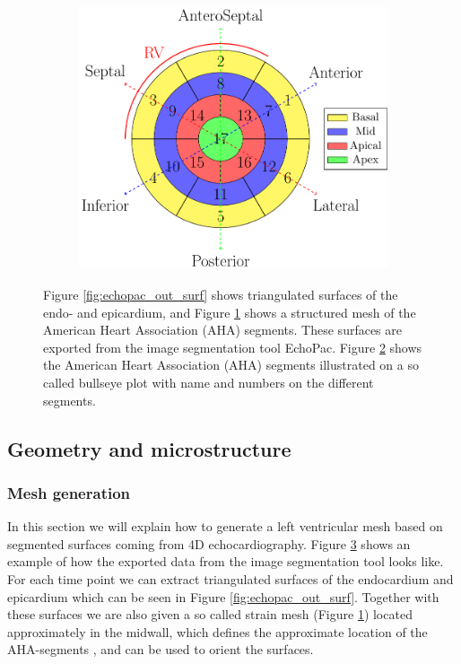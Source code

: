 \begin{figure}[htbp]
\begin{subfigure}[t]{0.3\textwidth}
    \caption{\label{fig:echopac_out_strain_mesh}}
  \end{subfigure}
  \begin{subfigure}[t]{0.38\textwidth}
    \includegraphics[width=\textwidth]{chapters/introduction/figures/bullseye/bullseye.pdf}
    \caption{\label{fig:bullseye_intro}}
  \end{subfigure}
\caption{Figure \ref{fig:echopac_out_surf} shows triangulated surfaces of the
      endo- and epicardium, and Figure
      \ref{fig:echopac_out_strain_mesh} shows a structured mesh of the
      American Heart Association (AHA) segments. These surfaces are
      exported from the image segmentation tool EchoPac. Figure 
      \ref{fig:bullseye_intro} shows the American Heart Association (AHA)
      segments illustrated on a so called bullseye plot with name and
      numbers on the different segments. }
\label{fig:echopac_output}
\end{figure}


\subsection{Geometry and microstructure}


\subsubsection{Mesh generation}
In this section we will explain how to generate a left ventricular
mesh based on segmented surfaces coming from 4D echocardiography.
Figure \ref{fig:echopac_output} shows an example of how the exported data
from the image segmentation tool looks like. For each time point we
can extract triangulated surfaces of the endocardium and epicardium
which can be seen in Figure \ref{fig:echopac_out_surf}. Together with
these surfaces we are also given a so called strain mesh (Figure
\ref{fig:echopac_out_strain_mesh}) located approximately in the
midwall, which defines the approximate location of the AHA-segments
\cite{cerqueira2002standardized}, and can be used to orient the surfaces. 



